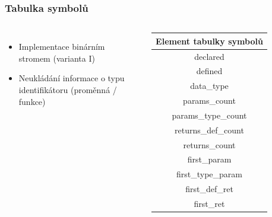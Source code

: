 \begin{frame}
  \frametitle{Tabulka symbolů}
    \begin{columns}
  \begin{itemize}
      \item Implementace binárním stromem (varianta I)
      \item Neukládání informace o typu identifikátoru (proměnná / funkce)
  \end{itemize}
  \begin{tabular}{ ||c|| } 
      \hline
     Element tabulky symbolů \\ [0.5ex] 
     \hline\hline
     declared \\
     defined \\
     data\_type \\
     params\_count \\
     params\_type\_count \\
     returns\_def\_count \\
     returns\_count \\
     first\_param \\
     first\_type\_param \\
     first\_def\_ret \\
     first\_ret \\
     \hline
  \end{tabular}
  \end{columns}
\end{frame}



